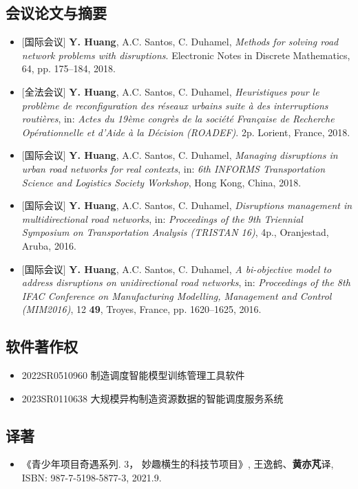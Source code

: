 \documentclass[letterpaper]{twentysecondcv} %
\begin{document}
\subsection{会议论文与摘要}
\begin{itemize}
    \item $[$国际会议$]$ \textbf{Y. Huang}, A.C. Santos, C. Duhamel, \textit{Methods for solving road network problems with disruptions}. Electronic Notes in Discrete Mathematics, 64, pp. 175--184, 2018.
    \item $[$全法会议$]$ \textbf{Y. Huang}, A.C. Santos, C. Duhamel, \textit{Heuristiques pour le problème de reconfiguration des réseaux urbains suite à des interruptions routières}, in: \textit{Actes du 19ème congrès de la société Française de Recherche Opérationnelle et d'Aide à la Décision (ROADEF)}. 2p. Lorient, France, 2018.
    \item $[$国际会议$]$ \textbf{Y. Huang}, A.C. Santos, C. Duhamel, \textit{Managing disruptions in urban road networks for real contexts}, in: \textit{6th INFORMS Transportation Science and Logistics Society Workshop}, Hong Kong, China, 2018.
    \item $[$国际会议$]$ \textbf{Y. Huang}, A.C. Santos, C. Duhamel, \textit{Disruptions management in multidirectional road networks}, in: \textit{Proceedings of the 9th Triennial Symposium on Transportation Analysis (TRISTAN 16)}, 4p., Oranjestad, Aruba, 2016.
    \item $[$国际会议$]$ \textbf{Y. Huang}, A.C. Santos, C. Duhamel, \textit{A bi-objective model to address disruptions on unidirectional road networks}, in: \textit{Proceedings of the 8th IFAC Conference on Manufacturing Modelling, Management and Control (MIM2016)}, 12 \textbf{49}, Troyes, France, pp. 1620--1625, 2016.
\end{itemize}

\vspace{-0.1cm}
\subsection{软件著作权}
\begin{itemize}
    \item 2022SR0510960 制造调度智能模型训练管理工具软件
    \item 2023SR0110638 大规模异构制造资源数据的智能调度服务系统
\end{itemize}

\vspace{-0.1cm}
\subsection{译著}
\begin{itemize}
    \item 《青少年项目奇遇系列. 3， 妙趣横生的科技节项目》, 王逸鹤、\textbf{黄亦芃}译, ISBN: 987-7-5198-5877-3, 2021.9.
\end{itemize}
\end{document}
